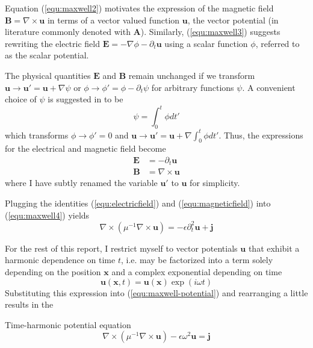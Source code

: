 \documentclass[11pt, a4paper]{article}
\begin{document}

Equation (\ref{equ:maxwell2}) motivates the expression of the magnetic field 
$\mathbf{B} = \nabla \times \mathbf{u}$ in terms of a vector valued function
$\mathbf{u}$, the vector potential (in literature commonly denoted with
$\mathbf{A}$). Similarly, (\ref{equ:maxwell3}) suggests
rewriting the electric field $\mathbf{E} = - \nabla \phi - \partial_t \mathbf{u}$
using a scalar function $\phi$, referred to as the scalar potential.

The physical quantities $\mathbf{E}$ and $\mathbf{B}$ remain unchanged 
if we transform $\mathbf{u} \to \mathbf{u}' = \mathbf{u} + \nabla \psi$ or
$\phi \to \phi' = \phi - \partial_t \psi$ for arbitrary functions $\psi$.
A convenient choice of $\psi$ is suggested in \citep{gauge-transformation} to be
\begin{equation}
    \psi = \int_0^t \phi dt' \label{equ:gauge}
\end{equation}
which transforms $\phi \to \phi' = 0$ and $\mathbf{u} \to \mathbf{u}' = \mathbf{u}
+ \nabla \int_0^t \phi dt'$. Thus, the expressions for the electrical and
magnetic field become
\begin{align}
    \mathbf{E} &= -\partial_t \mathbf{u} \label{equ:electricfield} \\
    \mathbf{B} &= \nabla \times \mathbf{u} \label{equ:magneticfield}
\end{align}
where I have subtly renamed the variable $\mathbf{u}'$ to $\mathbf{u}$ for simplicity.

Plugging the identities (\ref{equ:electricfield}) and (\ref{equ:magneticfield})
into (\ref{equ:maxwell4}) yields 
\begin{equation}
    \nabla \times (\mu^{-1} \nabla \times \mathbf{u}) = - \epsilon \partial_t^2 \mathbf{u} + \mathbf{j} \label{equ:maxwell-potential}
\end{equation}

For the rest of this report, I restrict myself to vector potentials $\mathbf{u}$
that exhibit a harmonic dependence on time $t$, i.e. may be factorized into
a term solely depending on the position $\mathbf{x}$ and a complex exponential
depending on time
\begin{equation}
    \mathbf{u}(\mathbf{x}, t) = \mathbf{u}(\mathbf{x}) \exp(i \omega t) \label{equ:time-harmonic}
\end{equation}
Substituting this expression into (\ref{equ:maxwell-potential}) and rearranging 
a little results in the
\begin{fancybox}{Time-harmonic potential equation}
    \begin{equation}
     \nabla \times (\mu^{-1} \nabla \times \mathbf{u}) - \epsilon \omega^2 \mathbf{u} = \mathbf{j} \label{equ:maxwell-timeharmonic}
    \end{equation}
\end{fancybox}
\end{document}
